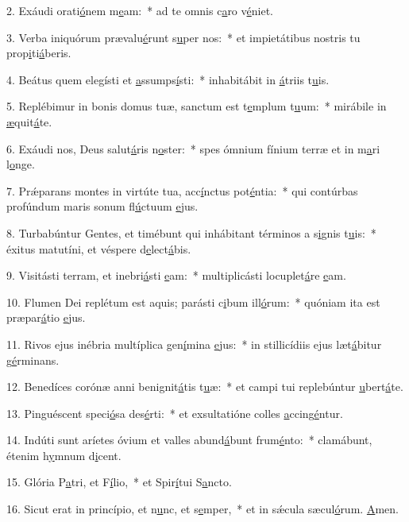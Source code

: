 2. Exáudi orati\uline{ó}nem m\uline{e}am:~* ad te omnis c\uline{a}ro v\uline{é}niet.\par 
3. Verba iniquórum prævalu\uline{é}runt s\uline{u}per nos:~* et impietátibus nostris tu prop\uline{i}ti\uline{á}beris.\par 
4. Beátus quem elegísti et \uline{a}ssumps\uline{í}sti:~* inhabitábit in \uline{á}triis t\uline{u}is.\par 
5. Replébimur in bonis domus tuæ, sanctum est t\uline{e}mplum t\uline{u}um:~* mirábile in \uline{æ}quit\uline{á}te.\par 
6. Exáudi nos, Deus salut\uline{á}ris n\uline{o}ster:~* spes ómnium fínium terræ et in m\uline{a}ri l\uline{o}nge.\par 
7. Prǽparans montes in virtúte tua, acc\uline{í}nctus pot\uline{é}ntia:~* qui contúrbas profúndum maris sonum fl\uline{ú}ctuum \uline{e}jus.\par 
8. Turbabúntur Gentes, et timébunt qui inhábitant términos a s\uline{i}gnis t\uline{u}is:~* éxitus matutíni, et véspere d\uline{e}lect\uline{á}bis.\par 
9. Visitásti terram, et inebri\uline{á}sti \uline{e}am:~* multiplicásti locuplet\uline{á}re \uline{e}am.\par 
10. Flumen Dei replétum est aquis; parásti c\uline{i}bum ill\uline{ó}rum:~* quóniam ita est præpar\uline{á}tio \uline{e}jus.\par 
11. Rivos ejus inébria multíplica gen\uline{í}mina \uline{e}jus:~* in stillicídiis ejus læt\uline{á}bitur g\uline{é}rminans.\par 
12. Benedíces corónæ anni benignit\uline{á}tis t\uline{u}æ:~* et campi tui replebúntur \uline{u}bert\uline{á}te.\par 
13. Pinguéscent speci\uline{ó}sa des\uline{é}rti:~* et exsultatióne colles \uline{a}ccing\uline{é}ntur.\par 
14. Indúti sunt aríetes óvium et valles abund\uline{á}bunt frum\uline{é}nto:~* clamábunt, étenim h\uline{y}mnum d\uline{i}cent.\par 
15. Glória P\uline{a}tri, et F\uline{í}lio,~* et Spir\uline{í}tui S\uline{a}ncto.\par 
16. Sicut erat in princípio, et n\uline{u}nc, et s\uline{e}mper,~* et in sǽcula sæcul\uline{ó}rum. \uline{A}men.\par 

